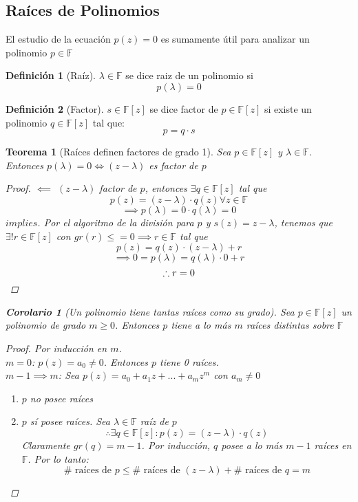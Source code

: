 \documentclass[11pt]{book}
\newtheorem{thm}{Teorema}[section]
\newtheorem*{cor}{Corolario}
\theoremstyle{definition}
\newtheorem{defn}{Definición}[section]
\begin{document}
\subsection{Raíces de Polinomios}
El estudio de la ecuación $p(z)=0$ es sumamente útil para analizar un polinomio $p\in\mathbb{F}$
\begin{defn}[Raíz]
$\lambda\in\mathbb{F}$ se dice raiz de un polinomio si
\[p(\lambda)=0\]
\end{defn}
\begin{defn}[Factor]
$s\in\mathbb{F}[z]$ se dice factor de $p\in\mathbb{F}[z]$ si existe un polinomio $q\in\mathbb{F}[z]$ tal que:
\[p=q\cdot s\]
\end{defn}
\begin{thm}[Raíces definen factores de grado 1]
Sea $p\in\mathbb{F}[z]$ y $\lambda\in\mathbb{F}$. Entonces $p(\lambda)=0\iff(z-\lambda)$ es factor de $p$
\begin{proof}
$\impliedby$ $(z-\lambda)$ factor de $p$, entonces $\exists q\in\mathbb{F}[z]$ tal que
\[p(z)=(z-\lambda)\cdot q(z)\forall z\in\mathbb{F}\]
\[\implies p(\lambda)=0\cdot q(\lambda)=0\]
$implies$. Por el algoritmo de la división para $p$ y $s(z)=z-\lambda$, tenemos que $\exists !r\in\mathbb{F}[z]$ con $gr(r)\leq=0\implies r\in\mathbb{F}$ tal que 
\[p(z)=q(z)\cdot (z-\lambda)+r\]
\[\implies 0=p(\lambda)=q(\lambda)\cdot 0+r\]
\[\therefore r=0\qedhere\]
\end{proof}
\begin{cor}[Un polinomio tiene tantas raíces como su grado]
Sea $p\in\mathbb{F}[z]$ un polinomio de grado $m\geq 0$. Entonces $p$ tiene a lo más $m$ raíces distintas sobre $\mathbb{F}$
\begin{proof}
Por inducción en $m$.\\
$m=0$: $p(z)=a_0\neq 0$. Entonces $p$ tiene 0 raíces.\\
$m-1\implies m$: Sea $p(z)=a_0+a_1z+...+a_mz^m$ con $a_m\neq 0$
\begin{enumerate}[label= \underline{Caso \arabic*}:]
	\item $p$ no posee raíces
	
	\item $p$ sí posee raíces. Sea $\lambda\in\mathbb{F}$ raíz de $p$
	\[\therefore \exists q\in\mathbb{F}[z]: p(z)=(z-\lambda)\cdot q(z)\]
	Claramente $gr(q)=m-1$. Por inducción, $q$ posee a lo más $m-1$ raíces en $\mathbb{F}$. Por lo tanto:
	\[\#\textrm{ raíces de }p\leq \#\textrm{ raíces de }(z-\lambda)+\#\textrm{ raíces de }q=m\]
\end{enumerate}
\end{proof}
\end{cor}
\end{thm}
\end{document}
